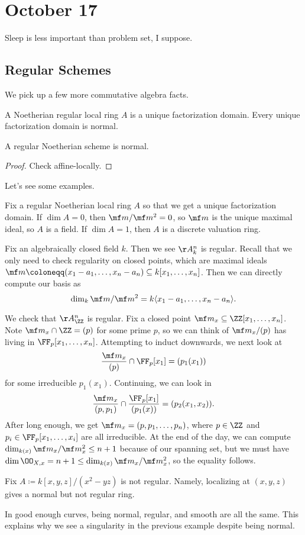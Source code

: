 \documentclass[../notes.tex]{subfiles}
\begin{document}
\section{October 17}

Sleep is less important than problem set, I suppose.

\subsection{Regular Schemes}
We pick up a few more commutative algebra facts.
\begin{theorem}
	A Noetherian regular local ring $A$ is a unique factorization domain. Every unique factorization domain is normal.
\end{theorem}
\begin{corollary}
	A regular Noetherian scheme is normal.
\end{corollary}
\begin{proof}
	Check affine-locally.
\end{proof}
Let's see some examples.
\begin{example}
	Fix a regular Noetherian local ring $A$ so that we get a unique factorization domain. If $\dim A=0$, then $\mf m/\mf m^2=0$, so $\mf m$ is the unique maximal ideal, so $A$ is a field. If $\dim A=1$, then $A$ is a discrete valuation ring.
\end{example}
\begin{example}
	Fix an algebraically closed field $k$. Then we see $\AA^n_k$ is regular. Recall that we only need to check regularity on closed points, which are maximal ideals $\mf m\coloneqq(x_1-a_1,\ldots,x_n-a_n)\subseteq k[x_1,\ldots,x_n]$. Then we can directly compute our basis as
	\[\dim_k\mf m/\mf m^2=k\langle x_1-a_1,\ldots,x_n-a_n\rangle.\]
\end{example}
\begin{example}
	We check that $\AA^n_\ZZ$ is regular. Fix a closed point $\mf m_x\subseteq\ZZ[x_1,\ldots,x_n]$. Note $\mf m_x\cap\ZZ=(p)$ for some prime $p$, so we can think of $\mf m_x/(p)$ has living in $\FF_p[x_1,\ldots,x_n]$. Attempting to induct downwards, we next look at
	\[\frac{\mf m_x}{(p)}\cap\FF_p[x_1]=(p_1(x_1))\]
	for some irreducible $p_1(x_1)$. Continuing, we can look in
	\[\frac{\mf m_x}{(p,p_1)}\cap\frac{\FF_p[x_1]}{(p_1(x))}=(p_2(x_1,x_2)).\]
	After long enough, we get $\mf m_x=(p,p_1,\ldots,p_n)$, where $p\in\ZZ$ and $p_i\in\FF_p[x_1,\ldots,x_i]$ are all irreducible. At the end of the day, we can compute $\dim_{k(x)}\mf m_x/\mf m_x^2\le n+1$ because of our spanning set, but we must have $\dim\OO_{X,x}=n+1\le\dim_{k(x)}\mf m_x/\mf m_x^2$, so the equality follows.
\end{example}
\begin{nex}
	Fix $A\coloneqq k[x,y,z]/(x^2-yz)$ is not regular. Namely, localizing at $(x,y,z)$ gives a normal but not regular ring.
\end{nex}
\begin{remark}
	In good enough curves, being normal, regular, and smooth are all the same. This explains why we see a singularity in the previous example despite being normal.
\end{remark}
\end{document}
